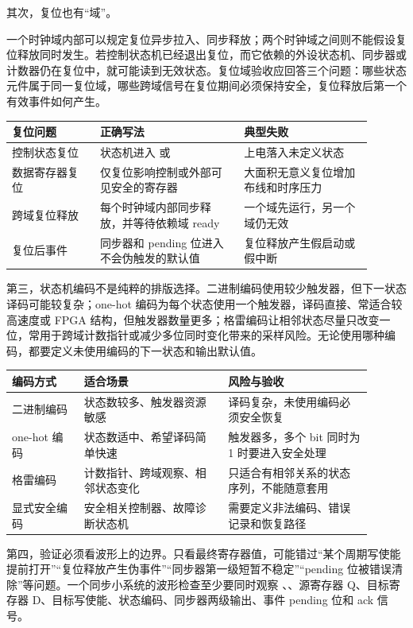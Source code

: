 其次，复位也有“域”。

一个时钟域内部可以规定复位异步拉入、同步释放；两个时钟域之间则不能假设复位释放同时发生。若控制状态机已经退出复位，而它依赖的外设状态机、同步器或计数器仍在复位中，就可能读到无效状态。复位域验收应回答三个问题：哪些状态元件属于同一复位域，哪些跨域信号在复位期间必须保持安全，复位释放后第一个有效事件如何产生。

\begin{longtable}{L{0.22\linewidth}L{0.36\linewidth}L{0.32\linewidth}}
\toprule
复位问题 & 正确写法 & 典型失败 \\
\midrule
控制状态复位 & 状态机进入  或  & 上电落入未定义状态 \\
数据寄存器复位 & 仅复位影响控制或外部可见安全的寄存器 & 大面积无意义复位增加布线和时序压力 \\
跨域复位释放 & 每个时钟域内部同步释放，并等待依赖域 ready & 一个域先运行，另一个域仍无效 \\
复位后事件 & 同步器和 pending 位进入不会伪触发的默认值 & 复位释放产生假启动或假中断 \\
\bottomrule
\end{longtable}

第三，状态机编码不是纯粹的排版选择。二进制编码使用较少触发器，但下一状态译码可能较复杂；one-hot 编码为每个状态使用一个触发器，译码直接、常适合较高速度或 FPGA 结构，但触发器数量更多；格雷编码让相邻状态尽量只改变一位，常用于跨域计数指针或减少多位同时变化带来的采样风险。无论使用哪种编码，都要定义未使用编码的下一状态和输出默认值。

\begin{longtable}{L{0.18\linewidth}L{0.36\linewidth}L{0.36\linewidth}}
\toprule
编码方式 & 适合场景 & 风险与验收 \\
\midrule
二进制编码 & 状态数较多、触发器资源敏感 & 译码复杂，未使用编码必须安全恢复 \\
one-hot 编码 & 状态数适中、希望译码简单快速 & 触发器多，多个 bit 同时为 1 时要进入安全处理 \\
格雷编码 & 计数指针、跨域观察、相邻状态变化 & 只适合有相邻关系的状态序列，不能随意套用 \\
显式安全编码 & 安全相关控制器、故障诊断状态机 & 需要定义非法编码、错误记录和恢复路径 \\
\bottomrule
\end{longtable}

第四，验证必须看波形上的边界。只看最终寄存器值，可能错过“某个周期写使能提前打开”“复位释放产生伪事件”“同步器第一级短暂不稳定”“pending 位被错误清除”等问题。一个同步小系统的波形检查至少要同时观察 、、源寄存器 Q、目标寄存器 D、目标写使能、状态编码、同步器两级输出、事件 pending 位和 ack 信号。

